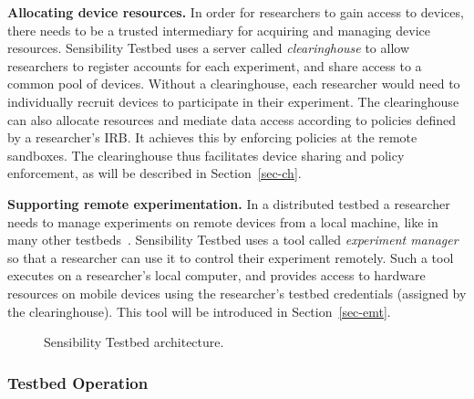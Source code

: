 \textbf{Allocating device resources.}
In order for researchers to gain access to devices, there needs to be a 
trusted intermediary for acquiring and managing device resources.
Sensibility Testbed uses a server called \textit{clearinghouse} to allow researchers to 
register accounts for each experiment, and share access to a common 
pool of devices. Without a clearinghouse, each researcher would 
need to individually recruit devices to participate in their experiment. 
The clearinghouse can also allocate resources and mediate 
data access according to policies defined by a researcher's IRB. It 
achieves this by enforcing policies at the remote sandboxes. The 
clearinghouse thus facilitates device sharing and policy enforcement, 
as will be described in Section~\ref{sec-ch}.

\textbf{Supporting remote experimentation.} 
In a distributed testbed a researcher needs to manage experiments 
on remote devices from a local machine, like in many other 
testbeds~\cite{hibler2008large, peterson2006experiences}. Sensibility 
Testbed uses a tool called \textit{experiment manager} so that a 
researcher can use it to control their experiment remotely. Such a tool 
executes on a researcher's local computer, and provides access to 
hardware resources on mobile devices using the researcher's testbed 
credentials (assigned by the clearinghouse). This tool will be introduced
in Section~\ref{sec-emt}.

\begin{figure}
\caption{\small Sensibility Testbed architecture. \label{fig-arch}}
\end{figure}

\subsubsection{Testbed Operation}

